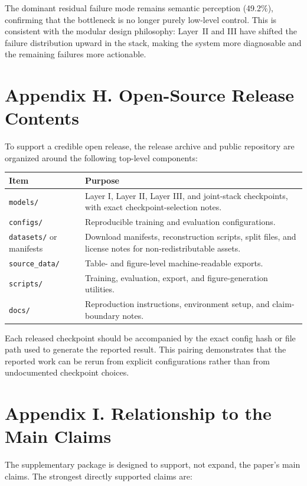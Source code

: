 \documentclass[11pt]{article}
\begin{document}
The dominant residual failure mode remains semantic perception (49.2\%), confirming that the bottleneck is no longer purely low-level control. This is consistent with the modular design philosophy: Layer~II and III have shifted the failure distribution upward in the stack, making the system more diagnosable and the remaining failures more actionable.

\section{Appendix H. Open-Source Release Contents}

To support a credible open release, the release archive and public repository are organized around the following top-level components:

\begin{longtable}{@{}p{} p{}@{}}
\toprule
Item & Purpose \\
\midrule
\endhead
\texttt{models/} & Layer I, Layer II, Layer III, and joint-stack checkpoints, with exact checkpoint-selection notes. \\
\texttt{configs/} & Reproducible training and evaluation configurations. \\
\texttt{datasets/} or manifests & Download manifests, reconstruction scripts, split files, and license notes for non-redistributable assets. \\
\texttt{source\_data/} & Table- and figure-level machine-readable exports. \\
\texttt{scripts/} & Training, evaluation, export, and figure-generation utilities. \\
\texttt{docs/} & Reproduction instructions, environment setup, and claim-boundary notes. \\
\bottomrule
\end{longtable}

Each released checkpoint should be accompanied by the exact config hash or file path used to generate the reported result. This pairing demonstrates that the reported work can be rerun from explicit configurations rather than from undocumented checkpoint choices.

\section{Appendix I. Relationship to the Main Claims}

The supplementary package is designed to support, not expand, the paper's main claims. The strongest directly supported claims are:
\end{document}
